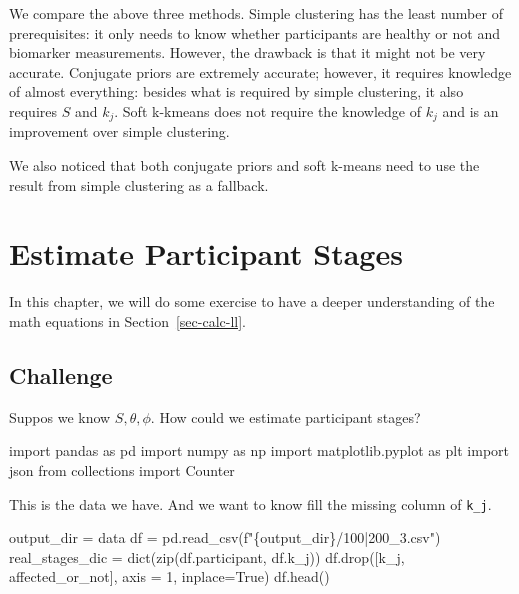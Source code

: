 \documentclass[
  letterpaper,
  DIV=11,
  numbers=noendperiod]{scrreprt}
\newenvironment{Shaded}{\begin{snugshade}}{\end{snugshade}}
\newcommand{\BuiltInTok}[1]{\textcolor[rgb]{0.00,0.23,0.31}{#1}}
\newcommand{\DecValTok}[1]{\textcolor[rgb]{0.68,0.00,0.00}{#1}}
\newcommand{\ImportTok}[1]{\textcolor[rgb]{0.00,0.46,0.62}{#1}}
\newcommand{\NormalTok}[1]{\textcolor[rgb]{0.00,0.23,0.31}{#1}}
\newcommand{\OperatorTok}[1]{\textcolor[rgb]{0.37,0.37,0.37}{#1}}
\newcommand{\SpecialCharTok}[1]{\textcolor[rgb]{0.37,0.37,0.37}{#1}}
\newcommand{\SpecialStringTok}[1]{\textcolor[rgb]{0.13,0.47,0.30}{#1}}
\newcommand{\StringTok}[1]{\textcolor[rgb]{0.13,0.47,0.30}{#1}}
\newcommand{\VariableTok}[1]{\textcolor[rgb]{0.07,0.07,0.07}{#1}}
\begin{document}
We compare the above three methods. Simple clustering has the least
number of prerequisites: it only needs to know whether participants are
healthy or not and biomarker measurements. However, the drawback is that
it might not be very accurate. Conjugate priors are extremely accurate;
however, it requires knowledge of almost everything: besides what is
required by simple clustering, it also requires \(S\) and \(k_j\). Soft
k-kmeans does not require the knowledge of \(k_j\) and is an improvement
over simple clustering.

We also noticed that both conjugate priors and soft k-means need to use
the result from simple clustering as a fallback.


\chapter{Estimate Participant Stages}\label{estimate-participant-stages}

In this chapter, we will do some exercise to have a deeper understanding
of the math equations in Section~\ref{sec-calc-ll}.

\section{Challenge}\label{challenge}

Suppos we know \(S, \theta, \phi\). How could we estimate participant
stages?

\begin{Shaded}
\begin{Highlighting}[]
\ImportTok{import}\NormalTok{ pandas }\ImportTok{as}\NormalTok{ pd }
\ImportTok{import}\NormalTok{ numpy }\ImportTok{as}\NormalTok{ np }
\ImportTok{import}\NormalTok{ matplotlib.pyplot }\ImportTok{as}\NormalTok{ plt }
\ImportTok{import}\NormalTok{ json }
\ImportTok{from}\NormalTok{ collections }\ImportTok{import}\NormalTok{ Counter}
\end{Highlighting}
\end{Shaded}

This is the data we have. And we want to know fill the missing column of
\texttt{k\_j}.

\begin{Shaded}
\begin{Highlighting}[]
\NormalTok{output\_dir }\OperatorTok{=} \StringTok{\textquotesingle{}data\textquotesingle{}}
\NormalTok{df }\OperatorTok{=}\NormalTok{ pd.read\_csv(}\SpecialStringTok{f"}\SpecialCharTok{\{}\NormalTok{output\_dir}\SpecialCharTok{\}}\SpecialStringTok{/100|200\_3.csv"}\NormalTok{)}
\NormalTok{real\_stages\_dic }\OperatorTok{=} \BuiltInTok{dict}\NormalTok{(}\BuiltInTok{zip}\NormalTok{(df.participant, df.k\_j))}
\NormalTok{df.drop([}\StringTok{\textquotesingle{}k\_j\textquotesingle{}}\NormalTok{, }\StringTok{\textquotesingle{}affected\_or\_not\textquotesingle{}}\NormalTok{], axis }\OperatorTok{=} \DecValTok{1}\NormalTok{, inplace}\OperatorTok{=}\VariableTok{True}\NormalTok{)}
\NormalTok{df.head()}
\end{Highlighting}
\end{Shaded}
\end{document}
